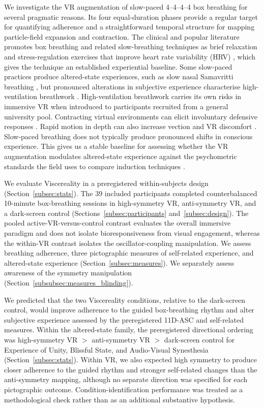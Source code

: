 \documentclass[pdflatex,sn-basic,lineno]{sn-jnl}
\begin{document}
We investigate the VR augmentation of slow-paced 4--4--4--4 box breathing for several pragmatic reasons. Its four equal-duration phases provide a regular target for quantifying adherence and a straightforward temporal structure for mapping particle-field expansion and contraction. The clinical and popular literature promotes box breathing and related slow-breathing techniques as brief relaxation and stress-regulation exercises that improve heart rate variability (HRV) \citep{Marchant2025, zaccaro2018breath, Laborde2022}, which gives the technique an established experiential baseline. Some slow-paced practices produce altered-state experiences, such as slow nasal Samavritti breathing \citep{zaccaro2022neural}, but pronounced alterations in subjective experience characterise high-ventilation breathwork \citep{bahi2024effects, havenith2025decreased, fincham2026airways, schmitz2026high}. High-ventilation breathwork carries its own risks in immersive VR when introduced to participants recruited from a general university pool. Contracting virtual environments can elicit involuntary defensive responses \citep{KodithuwakkuArachchige2022walls}. Rapid motion in depth can also increase vection and VR discomfort \citep{Poehlmann2021vection}. Slow-paced breathing does not typically produce pronounced shifts in conscious experience. This gives us a stable baseline for assessing whether the VR augmentation modulates altered-state experience against the psychometric standards the field uses to compare induction techniques \citep{studerus2010, Dittrich1998}.

We evaluate Viscereality in a preregistered within-subjects design (Section~\ref{subsec:stats}). The 39 included participants completed counterbalanced 10-minute box-breathing sessions in high-symmetry VR, anti-symmetry VR, and a dark-screen control (Sections~\ref{subsec:participants} and~\ref{subsec:design}). The pooled active-VR-versus-control contrast evaluates the overall immersive paradigm and does not isolate bioresponsiveness from visual engagement, whereas the within-VR contrast isolates the oscillator-coupling manipulation. We assess breathing adherence, three pictographic measures of self-related experience, and altered-state experience (Section~\ref{subsec:measures}). We separately assess awareness of the symmetry manipulation (Section~\ref{subsubsec:measures_blinding}).

We predicted that the two Viscereality conditions, relative to the dark-screen control, would improve adherence to the guided box-breathing rhythm and alter subjective experience assessed by the preregistered 11D-ASC and self-related measures. Within the altered-state family, the preregistered directional ordering was high-symmetry VR $>$ anti-symmetry VR $>$ dark-screen control for Experience of Unity, Blissful State, and Audio-Visual Synesthesia (Section~\ref{subsec:stats}). Within VR, we also expected high symmetry to produce closer adherence to the guided rhythm and stronger self-related changes than the anti-symmetry mapping, although no separate direction was specified for each pictographic outcome. Condition-identification performance was treated as a methodological check rather than as an additional substantive hypothesis.
\end{document}
